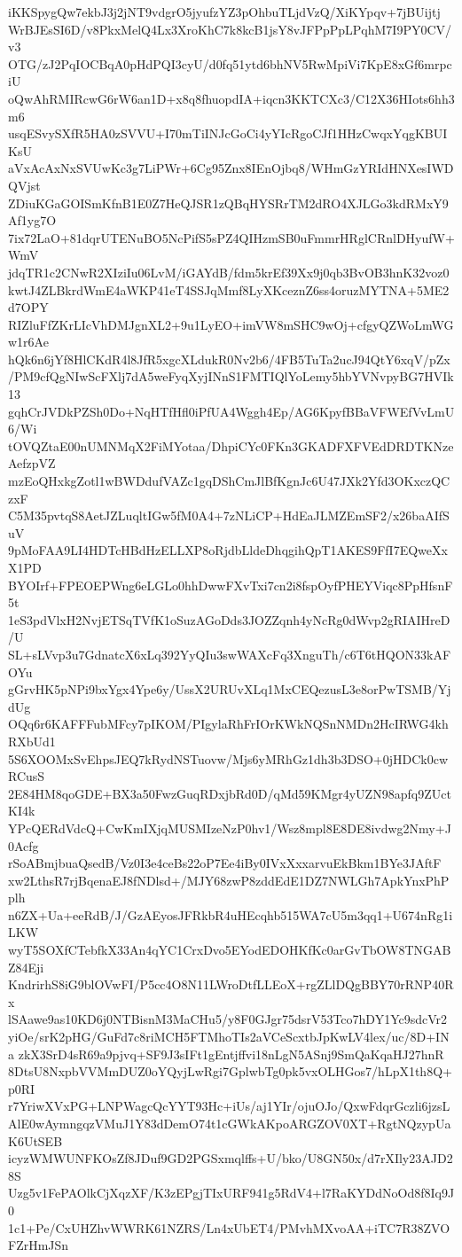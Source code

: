 iKKSpygQw7ekbJ3j2jNT9vdgrO5jyufzYZ3pOhbuTLjdVzQ/XiKYpqv+7jBUijtj
WrBJEsSI6D/v8PkxMelQ4Lx3XroKhC7k8kcB1jsY8vJFPpPpLPqhM7I9PY0CV/v3
OTG/zJ2PqIOCBqA0pHdPQI3cyU/d0fq51ytd6bhNV5RwMpiVi7KpE8xGf6mrpciU
oQwAhRMIRcwG6rW6an1D+x8q8fhuopdIA+iqcn3KKTCXc3/C12X36HIots6hh3m6
usqESvySXfR5HA0zSVVU+I70mTiINJcGoCi4yYIcRgoCJf1HHzCwqxYqgKBUIKsU
aVxAcAxNxSVUwKc3g7LiPWr+6Cg95Znx8IEnOjbq8/WHmGzYRIdHNXesIWDQVjst
ZDiuKGaGOISmKfnB1E0Z7HeQJSR1zQBqHYSRrTM2dRO4XJLGo3kdRMxY9Af1yg7O
7ix72LaO+81dqrUTENuBO5NcPifS5sPZ4QIHzmSB0uFmmrHRglCRnlDHyufW+WmV
jdqTR1c2CNwR2XIziIu06LvM/iGAYdB/fdm5krEf39Xx9j0qb3BvOB3hnK32voz0
kwtJ4ZLBkrdWmE4aWKP41eT4SSJqMmf8LyXKceznZ6ss4oruzMYTNA+5ME2d7OPY
RIZluFfZKrLIcVhDMJgnXL2+9u1LyEO+imVW8mSHC9wOj+cfgyQZWoLmWGw1r6Ae
hQk6n6jYf8HlCKdR4l8JfR5xgcXLdukR0Nv2b6/4FB5TuTa2ucJ94QtY6xqV/pZx
/PM9cfQgNIwScFXlj7dA5weFyqXyjINnS1FMTIQlYoLemy5hbYVNvpyBG7HVIk13
gqhCrJVDkPZSh0Do+NqHTfHfl0iPfUA4Wggh4Ep/AG6KpyfBBaVFWEfVvLmU6/Wi
tOVQZtaE00nUMNMqX2FiMYotaa/DhpiCYc0FKn3GKADFXFVEdDRDTKNzeAefzpVZ
mzEoQHxkgZotl1wBWDdufVAZc1gqDShCmJlBfKgnJc6U47JXk2Yfd3OKxczQCzxF
C5M35pvtqS8AetJZLuqltIGw5fM0A4+7zNLiCP+HdEaJLMZEmSF2/x26baAIfSuV
9pMoFAA9LI4HDTcHBdHzELLXP8oRjdbLldeDhqgihQpT1AKES9FfI7EQweXxX1PD
BYOIrf+FPEOEPWng6eLGLo0hhDwwFXvTxi7cn2i8fspOyfPHEYViqc8PpHfsnF5t
1eS3pdVlxH2NvjETSqTVfK1oSuzAGoDds3JOZZqnh4yNcRg0dWvp2gRIAIHreD/U
SL+sLVvp3u7GdnatcX6xLq392YyQIu3swWAXcFq3XnguTh/c6T6tHQON33kAFOYu
gGrvHK5pNPi9bxYgx4Ype6y/UssX2URUvXLq1MxCEQezusL3e8orPwTSMB/YjdUg
OQq6r6KAFFFubMFcy7pIKOM/PIgylaRhFrIOrKWkNQSnNMDn2HcIRWG4khRXbUd1
5S6XOOMxSvEhpsJEQ7kRydNSTuovw/Mjs6yMRhGz1dh3b3DSO+0jHDCk0cwRCusS
2E84HM8qoGDE+BX3a50FwzGuqRDxjbRd0D/qMd59KMgr4yUZN98apfq9ZUctKI4k
YPcQERdVdcQ+CwKmIXjqMUSMIzeNzP0hv1/Wsz8mpl8E8DE8ivdwg2Nmy+J0Acfg
rSoABmjbuaQsedB/Vz0I3e4ceBs22oP7Ee4iBy0IVxXxxarvuEkBkm1BYe3JAftF
xw2LthsR7rjBqenaEJ8fNDlsd+/MJY68zwP8zddEdE1DZ7NWLGh7ApkYnxPhPplh
n6ZX+Ua+eeRdB/J/GzAEyosJFRkbR4uHEcqhb515WA7cU5m3qq1+U674nRg1iLKW
wyT5SOXfCTebfkX33An4qYC1CrxDvo5EYodEDOHKfKc0arGvTbOW8TNGABZ84Eji
KndrirhS8iG9blOVwFI/P5cc4O8N11LWroDtfLLEoX+rgZLlDQgBBY70rRNP40Rx
lSAawe9as10KD6j0NTBisnM3MaCHu5/y8F0GJgr75dsrV53Tco7hDY1Yc9sdcVr2
yiOe/srK2pHG/GuFd7c8riMCH5FTMhoTIs2aVCeScxtbJpKwLV4lex/uc/8D+INa
zkX3SrD4sR69a9pjvq+SF9J3sIFt1gEntjffvi18nLgN5ASnj9SmQaKqaHJ27hnR
8DtsU8NxpbVVMmDUZ0oYQyjLwRgi7GplwbTg0pk5vxOLHGos7/hLpX1th8Q+p0RI
r7YriwXVxPG+LNPWagcQcYYT93Hc+iUs/aj1YIr/ojuOJo/QxwFdqrGczli6jzsL
AlE0wAymngqzVMuJ1Y83dDemO74t1cGWkAKpoARGZOV0XT+RgtNQzypUaK6UtSEB
icyzWMWUNFKOsZf8JDuf9GD2PGSxmqlffs+U/bko/U8GN50x/d7rXIly23AJD28S
Uzg5v1FePAOlkCjXqzXF/K3zEPgjTIxURF941g5RdV4+l7RaKYDdNoOd8f8Iq9J0
1c1+Pe/CxUHZhvWWRK61NZRS/Ln4xUbET4/PMvhMXvoAA+iTC7R38ZVOFZrHmJSn
